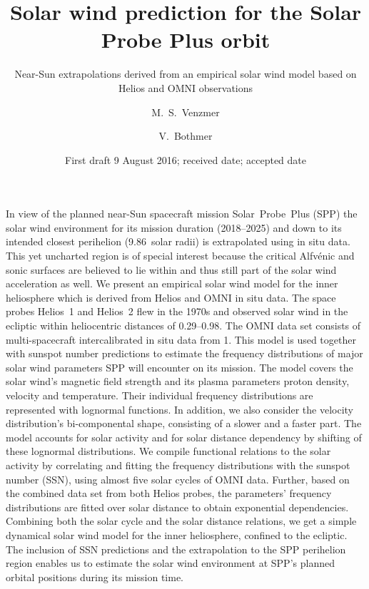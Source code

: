 
\title{Solar wind prediction for the Solar Probe Plus orbit}
\subtitle{Near-Sun extrapolations derived from an empirical solar wind model based on Helios and OMNI observations}

\author{M.~S.~Venzmer
\and V.~Bothmer}


\date{First draft 9 August 2016; received date; accepted date }

\abstract
{In view of the planned near-Sun spacecraft mission Solar~Probe~Plus (SPP) the solar wind environment for its mission duration (2018--2025) and down to its intended closest perihelion (\num{9.86}~solar radii) is extrapolated using in situ data. This yet uncharted region is of special interest because the critical Alfvénic and sonic surfaces are believed to lie within and thus still part of the solar wind acceleration as well.}	%
{We present an empirical solar wind model for the inner heliosphere which is derived from Helios and OMNI in situ data. The space probes Helios~1 and Helios~2 flew in the 1970s and observed solar wind in the ecliptic within heliocentric distances of \SIrange{0.29}{0.98}{\au}. The OMNI data set consists of multi-spacecraft intercalibrated in situ data from \SI{1}{\au}. This model is used together with sunspot number predictions to estimate the frequency distributions of major solar wind parameters SPP will encounter on its mission.}	%
{The model covers the solar wind's magnetic field strength and its plasma parameters proton density, velocity and temperature.
Their individual frequency distributions are represented with lognormal functions. In addition, we also consider the velocity distribution's bi-componental shape, consisting of a slower and a faster part. The model accounts for solar activity and for solar distance dependency by shifting of these lognormal distributions. We compile functional relations to the solar activity by correlating and fitting the frequency distributions with the sunspot number (SSN), using almost five solar cycles of OMNI data. Further, based on the combined data set from both Helios probes, the parameters' frequency distributions are fitted over solar distance to obtain exponential dependencies. Combining both the solar cycle and the solar distance relations, we get a simple dynamical solar wind model for the inner heliosphere, confined to the ecliptic.}	%
{The inclusion of SSN predictions and the extrapolation to the SPP perihelion region enables us to estimate the solar wind environment at SPP's planned orbital positions during its mission time.}	%
{}	%

